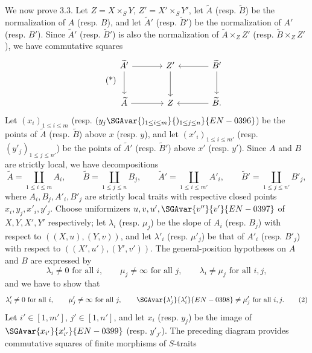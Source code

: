 We now prove 3.3. Let $Z=X\times_SY$, $Z'=X'\times_SY'$, let $\widetilde A$ (resp. $\widetilde B$) be the normalization of $A$ (resp. $B$), and let $\widetilde A'$ (resp. $\widetilde B'$) be the normalization of $A'$ (resp. $B'$). Since $\widetilde A'$ (resp. $\widetilde B'$) is also the normalization of $\widetilde A\times_ZZ'$ (resp. $\widetilde B\times_ZZ'$), we have commutative squares
\begin{equation}\tag{*}
\begin{tikzcd}[column sep=large,row sep=large]
\widetilde A' \arrow[r] \arrow[d] & Z' \arrow[d] & \widetilde B' \arrow[l] \arrow[d]\\
\widetilde A \arrow[r] & Z & \widetilde B . \arrow[l]
\end{tikzcd}
\end{equation}
Let $(x_i)_{1\le i\le m}$ (resp. $(y_j\SGAvar{)_{1\le i\le m}}{)_{1\le j\le n}}{EN-0396}$) be the points of $\widetilde A$ (resp. $\widetilde B$) above $x$ (resp. $y$), and let $(x'_i)_{1\le i\le m'}$ (resp. $(y'_j)_{1\le j\le n'}$) be the points of $\widetilde A'$ (resp. $\widetilde B'$) above $x'$ (resp. $y'$). Since $A$ and $B$ are strictly local, we have decompositions
\[
\widetilde A=\coprod_{1\le i\le m}A_i,\qquad
\widetilde B=\coprod_{1\le j\le n}B_j,\qquad
\widetilde A'=\coprod_{1\le i\le m'}A'_i,\qquad
\widetilde B'=\coprod_{1\le j\le n'}B'_j,
\]
where $A_i,B_j,A'_i,B'_j$ are strictly local traits with respective closed points $x_i,y_j,x'_i,y'_j$. Choose uniformizers $u,v,u',\SGAvar{v''}{v'}{EN-0397}$ of $X,Y,X',Y'$ respectively; let $\lambda_i$ (resp. $\mu_j$) be the slope of $A_i$ (resp. $B_j$) with respect to $((X,u),(Y,v))$, and let $\lambda'_i$ (resp. $\mu'_j$) be that of $A'_i$ (resp. $B'_j$) with respect to $((X',u'),(Y',v'))$. The general-position hypotheses on $A$ and $B$ are expressed by
\begin{equation}
\lambda_i\ne0\text{ for all }i,\qquad
\mu_j\ne\infty\text{ for all }j,\qquad
\lambda_i\ne\mu_j\text{ for all }i,j,
\tag{1}
\end{equation}
and we have to show that
\begin{equation}
\lambda'_i\ne0\text{ for all }i,\qquad
\mu'_j\ne\infty\text{ for all }j,\qquad
\SGAvar{\lambda'_j}{\lambda'_i}{EN-0398}\ne\mu'_j\text{ for all }i,j.
\tag{2}
\end{equation}
Let %
$i'\in[1,m']$, $j'\in[1,n']$, and let $x_i$ (resp. $y_j$) be the image of $\SGAvar{x_{i'}}{x'_{i'}}{EN-0399}$ (resp. $y'_{j'}$). The preceding diagram provides commutative squares of finite morphisms of $S$-traits
